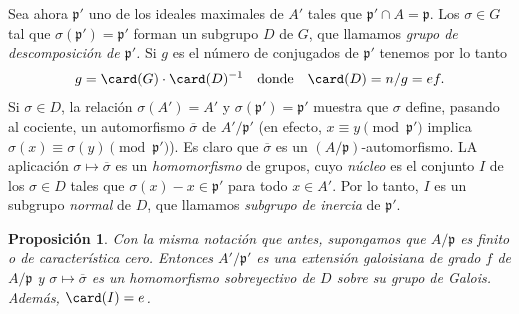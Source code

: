 \documentclass[oneside,bibtotoc,leqno,spanish]{amsbook}
\newcommand{\idl}[1]{\mathfrak{#1}}
\newcommand{\oline}[1]{\overline{#1}}
\numberwithin{equation}{section}
\theoremstyle{defi}
\theoremstyle{note}
\newtheorem{proposition}{Proposici\'on}
\theoremstyle{rem}
\numberwithin{theorem}{section}
\numberwithin{proposition}{section}
\numberwithin{definition}{section}
\numberwithin{lemma}{section}
\numberwithin{corollary}{section}
\numberwithin{example}{section}
\numberwithin{footnote}{section}%
\begin{document}
Sea ahora $\idl{p}'$ uno de los ideales maximales de $A'$ tales que $\idl{p}'\cap A = \idl{p}$. Los $\sigma\in G$
tal que $\sigma(\idl{p}') = \idl{p}'$ forman un subgrupo $D$ de $G$, que llamamos {\em grupo de descomposici\'on de
$\idl{p}'$.} Si $g$ es el n\'umero de conjugados de $\idl{p}'$ tenemos por lo tanto
\begin{gather}\label{eq6.2.2}
g=\card(G)\cdot\card(D)^{-1}\quad\text{donde}\quad\card(D) = n/g = ef.
\end{gather}
Si $\sigma\in D$, la relaci\'on $\sigma(A') = A'$ y $\sigma(\idl{p}') = \idl{p}'$ muestra que $\sigma$ define,
pasando al cociente, un automorfismo $\oline\sigma$ de $A'/\idl{p}'$ (en efecto,
$x\equiv y\pmod{\idl{p}'}$ implica $\sigma(x)\equiv\sigma(y)\pmod{\idl{p}'}$). Es claro que $\oline\sigma$
es un $(A/\idl{p})$-automorfismo. LA aplicaci\'on $\sigma\mapsto\oline\sigma$ es un {\em homomorfismo} de grupos,
cuyo {\em n\'ucleo} es el conjunto $I$ de los $\sigma\in D$ tales que $\sigma(x)-x\in\idl{p}'$ para todo $x\in A'$.
Por lo tanto, $I$ es un subgrupo {\em normal} de $D$, que llamamos {\em subgrupo de inercia} de $\idl{p}'$.

\begin{proposition}\label{prop6.2.2}
Con la misma notaci\'on que antes, supongamos que $A/\idl{p}$ es finito o de caracter\'istica cero. Entonces
$A'/\idl{p}'$ es una extensi\'on galoisiana de grado $f$ de $A/\idl{p}$ y $\sigma\mapsto\oline\sigma$ es un
homomorfismo sobreyectivo de $D$ sobre su grupo de Galois. Adem\'as, $\card(I) = e$.
\end{proposition}
\end{document}
